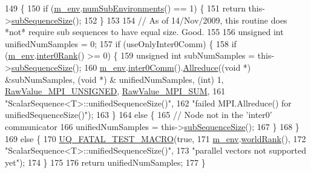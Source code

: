 \begin{DoxyCode}
149 \{
150   \textcolor{keywordflow}{if} (\hyperlink{class_q_u_e_s_o_1_1_scalar_sequence_a71618cd6351b29361b437af68447a4c8}{m\_env}.\hyperlink{class_q_u_e_s_o_1_1_base_environment_ac0345f57e31ef7833e379ed972bd094d}{numSubEnvironments}() == 1) \{
151     \textcolor{keywordflow}{return} this->\hyperlink{class_q_u_e_s_o_1_1_scalar_sequence_a0288ea295eedc216a1617b3286f6f3a0}{subSequenceSize}();
152   \}
153 
154   \textcolor{comment}{// As of 14/Nov/2009, this routine does *not* require sub sequences to have equal size. Good.}
155 
156   \textcolor{keywordtype}{unsigned} \textcolor{keywordtype}{int} unifiedNumSamples = 0;
157   \textcolor{keywordflow}{if} (useOnlyInter0Comm) \{
158     \textcolor{keywordflow}{if} (\hyperlink{class_q_u_e_s_o_1_1_scalar_sequence_a71618cd6351b29361b437af68447a4c8}{m\_env}.\hyperlink{class_q_u_e_s_o_1_1_base_environment_ae106b5bb8a80b655b88b3a26b1e7c185}{inter0Rank}() >= 0) \{
159       \textcolor{keywordtype}{unsigned} \textcolor{keywordtype}{int} subNumSamples = this->\hyperlink{class_q_u_e_s_o_1_1_scalar_sequence_a0288ea295eedc216a1617b3286f6f3a0}{subSequenceSize}();
160       \hyperlink{class_q_u_e_s_o_1_1_scalar_sequence_a71618cd6351b29361b437af68447a4c8}{m\_env}.\hyperlink{class_q_u_e_s_o_1_1_base_environment_a689e4d140c74d495d97eb498714a4b82}{inter0Comm}().\hyperlink{class_q_u_e_s_o_1_1_mpi_comm_a72e137e60ef8060efb1ee5fc874fa4b8}{Allreduce}((\textcolor{keywordtype}{void} *) &subNumSamples, (\textcolor{keywordtype}{void} *) &
      unifiedNumSamples, (\textcolor{keywordtype}{int}) 1, \hyperlink{_mpi_comm_8h_a06cbfbc33436f6e0dc8a48ff3c49bdfc}{RawValue\_MPI\_UNSIGNED}, \hyperlink{_mpi_comm_8h_afbf78d291c032aa7f512bc566cee2bd1}{RawValue\_MPI\_SUM},
161                                    \textcolor{stringliteral}{"ScalarSequence<T>::unifiedSequenceSize()"},
162                                    \textcolor{stringliteral}{"failed MPI.Allreduce() for unifiedSequenceSize()"});
163     \}
164     \textcolor{keywordflow}{else} \{
165       \textcolor{comment}{// Node not in the 'inter0' communicator}
166       unifiedNumSamples = this->\hyperlink{class_q_u_e_s_o_1_1_scalar_sequence_a0288ea295eedc216a1617b3286f6f3a0}{subSequenceSize}();
167     \}
168   \}
169   \textcolor{keywordflow}{else} \{
170     \hyperlink{_defines_8h_a56d63d18d0a6d45757de47fcc06f574d}{UQ\_FATAL\_TEST\_MACRO}(\textcolor{keyword}{true},
171                         \hyperlink{class_q_u_e_s_o_1_1_scalar_sequence_a71618cd6351b29361b437af68447a4c8}{m\_env}.\hyperlink{class_q_u_e_s_o_1_1_base_environment_a78b57112bbd0e6dd0e8afec00b40ffa7}{worldRank}(),
172                         \textcolor{stringliteral}{"ScalarSequence<T>::unifiedSequenceSize()"},
173                         \textcolor{stringliteral}{"parallel vectors not supported yet"});
174   \}
175 
176   \textcolor{keywordflow}{return} unifiedNumSamples;
177 \}
\end{DoxyCode}

